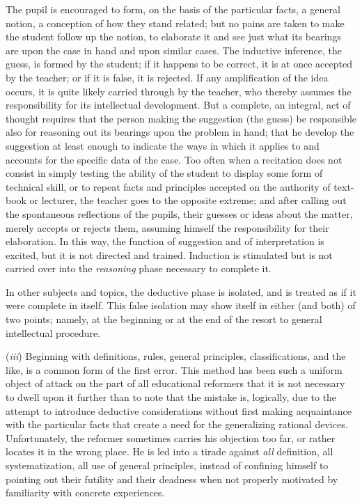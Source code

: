 \documentclass[showtrims,ustradepaper]{memoir}
\begin{document}
The pupil is encouraged to form, on the basis of the particular facts, a
general notion, a conception of how they stand related; but no pains are
taken to make the student follow up the notion, to elaborate it and see
just what its bearings are upon the case in hand and upon similar cases.
The inductive inference, the guess, is formed by the student; if it
happens to be correct, it is at once accepted by the teacher; or if it
is false, it is rejected. If any amplification of the idea occurs, it
is
quite likely carried through by the teacher, who thereby assumes the
responsibility for its intellectual development. But a complete, an
integral, act of thought requires that the person making the suggestion
(the guess) be responsible also for reasoning out its bearings upon the
problem in hand; that he develop the suggestion at least enough to
indicate the ways in which it applies to and accounts for the specific
data of the case. Too often when a recitation does not consist in simply
testing the ability of the student to display some form of technical
skill, or to repeat facts and principles accepted on the authority of
text-book or lecturer, the teacher goes to the opposite extreme; and
after calling out the spontaneous reflections of the pupils, their
guesses or ideas about the matter, merely accepts or rejects them,
assuming himself the responsibility for their elaboration. In this way,
the function of suggestion and of interpretation is excited, but it is
not directed and trained. Induction is stimulated but is not carried
over into the \emph{reasoning} phase necessary to complete it.

In other subjects and topics, the deductive phase is isolated, and is
treated as if it were complete in itself. This false isolation may show
itself in either (and both) of two points; namely, at the beginning or
at the end of the resort to general intellectual procedure.


(\emph{iii}) Beginning with definitions, rules, general principles,
classifications, and the like, is a common form of the first error. This
method has been such a uniform object of attack on the part of all
educational reformers that it is not necessary to dwell upon it further
than to note that the mistake is, logically, due to the attempt to
introduce deductive considerations without first making acquaintance
with the particular facts
that
create a need for the generalizing rational devices. Unfortunately, the
reformer sometimes carries his objection too far, or rather locates it
in the wrong place. He is led into a tirade against \emph{all}
definition, all systematization, all use of general principles, instead
of confining himself to pointing out their futility and their deadness
when not properly motivated by familiarity with concrete experiences.
\end{document}
